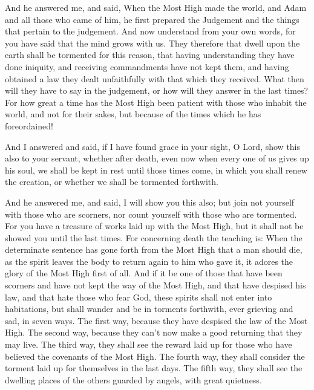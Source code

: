 {\par }{\PP {}And he answered me, and said, When the Most High made the world, and Adam and all those who came of him, he first prepared the Judgement and the things that pertain to the judgement.
And now understand from your own words, for you have said that the mind grows with us.
They therefore that dwell upon the earth shall be tormented for this reason, that having understanding they have done iniquity, and receiving commandments have not kept them, and having obtained a law they dealt unfaithfully with that which they received.
What then will they have to say in the judgement, or how will they answer in the last times?
For how great a time has the Most High been patient with those who inhabit the world, and not for their sakes, but because of the times which he has foreordained!
\par }{\PP {}And I answered and said, if I have found grace in your sight, O Lord, show this also to your servant, whether after death, even now when every one of us gives up his soul, we shall be kept in rest until those times come, in which you shall renew the creation, or whether we shall be tormented forthwith.
\par }{\PP {}And he answered me, and said, I will show you this also; but join not yourself with those who are scorners, nor count yourself with those who are tormented.
For you have a treasure of
{} works laid up with the Most High, but it shall not be showed you until the last times.
For concerning death the teaching is: When the determinate sentence has gone forth from the Most High that a man should die, as the spirit leaves the body to return again to him who gave it, it adores the glory of the Most High first of all.
And if it be one of those that have been scorners and have not kept the way of the Most High, and that have despised his law, and that hate those who fear
 God,
these spirits shall not enter into habitations, but shall wander and be in torments forthwith, ever grieving and sad, in seven ways.
The first way, because they have despised the law of the Most High.
The second way, because they can’t now make a good returning that they may live.
The third way, they shall see the reward laid up for those who have believed the covenants of the Most High.
The fourth way, they shall consider the torment laid up for themselves in the last days.
The fifth way, they shall see the dwelling places of the others guarded by angels, with great quietness.
}
